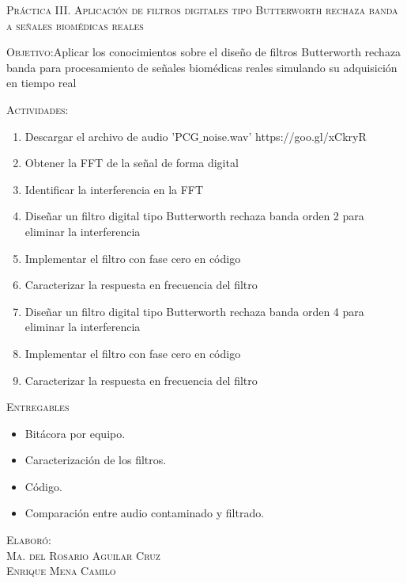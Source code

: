 \documentclass[10pt,letterpaper,spanish,twoside]{report}
\begin{document}
\docdate

\begin{center}
 \textsc{\asignatura}\vspace{.2em}
\end{center}

\textsc{Práctica III. Aplicación de filtros digitales tipo Butterworth rechaza banda a señales biomédicas reales}

\textsc{Objetivo:}Aplicar los conocimientos sobre el diseño de filtros Butterworth rechaza banda para procesamiento de señales biomédicas reales simulando su adquisición en tiempo real

\textsc{Actividades:}
\begin{enumerate}
  \item Descargar el archivo de audio 'PCG$\_$noise.wav' https://goo.gl/xCkryR
  \item Obtener la FFT de la señal de forma digital
  \item Identificar la interferencia en la FFT
  \item Diseñar un filtro digital tipo Butterworth rechaza banda orden 2 para eliminar la interferencia
  \item Implementar el filtro con fase cero en código
  \item Caracterizar la respuesta en frecuencia del filtro
  \item Diseñar un filtro digital tipo Butterworth rechaza banda orden 4 para eliminar la interferencia
  \item Implementar el filtro con fase cero en código
  \item Caracterizar la respuesta en frecuencia del filtro
\end{enumerate}

\textsc{Entregables}
\begin{itemize}
  \item Bitácora por equipo.
  \item Caracterización de los filtros.
  \item Código.
  \item Comparación entre audio contaminado y filtrado.
\end{itemize}


\vfill
\begin{flushright}
\textsc{Elaboró:\\
Ma. del Rosario Aguilar Cruz\\
Enrique Mena Camilo}
\end{flushright}
\end{document}
